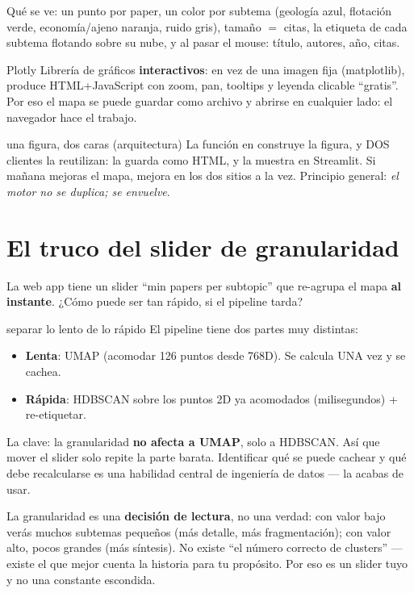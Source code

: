 \documentclass[11pt,a4paper]{article}
\begin{document}
Qué se ve: un punto por paper, un color por subtema (geología azul, flotación verde,
economía/ajeno naranja, ruido gris), tamaño $=$ citas, la etiqueta de cada subtema flotando
sobre su nube, y al pasar el mouse: título, autores, año, citas.

\begin{concepto}{Plotly}
Librería de gráficos \textbf{interactivos}: en vez de una imagen fija (matplotlib), produce
HTML+JavaScript con zoom, pan, tooltips y leyenda clicable ``gratis''. Por eso el mapa se
puede guardar como archivo y abrirse en cualquier lado: el navegador hace el trabajo.
\end{concepto}

\begin{concepto}{una figura, dos caras (arquitectura)}
La función  en  construye la figura, y
DOS clientes la reutilizan:  la guarda como HTML, y 
la muestra en Streamlit. Si mañana mejoras el mapa, mejora en los dos sitios a la vez.
Principio general: \emph{el motor no se duplica; se envuelve}.
\end{concepto}

\section{El truco del slider de granularidad}

La web app tiene un slider ``min papers per subtopic'' que re-agrupa el mapa \textbf{al
instante}. ¿Cómo puede ser tan rápido, si el pipeline tarda?

\begin{concepto}{separar lo lento de lo rápido}
El pipeline tiene dos partes muy distintas:
\begin{itemize}
  \item \textbf{Lenta}: UMAP (acomodar 126 puntos desde 768D). Se calcula UNA vez y se cachea.
  \item \textbf{Rápida}: HDBSCAN sobre los puntos 2D ya acomodados (milisegundos) + re-etiquetar.
\end{itemize}
La clave: la granularidad \textbf{no afecta a UMAP}, solo a HDBSCAN. Así que mover el slider
solo repite la parte barata. Identificar qué se puede cachear y qué debe recalcularse es una
habilidad central de ingeniería de datos --- la acabas de usar.
\end{concepto}

\begin{ojo}
La granularidad es una \textbf{decisión de lectura}, no una verdad: con valor bajo verás
muchos subtemas pequeños (más detalle, más fragmentación); con valor alto, pocos grandes
(más síntesis). No existe ``el número correcto de clusters'' — existe el que mejor cuenta la
historia para tu propósito. Por eso es un slider tuyo y no una constante escondida.
\end{ojo}
\end{document}
